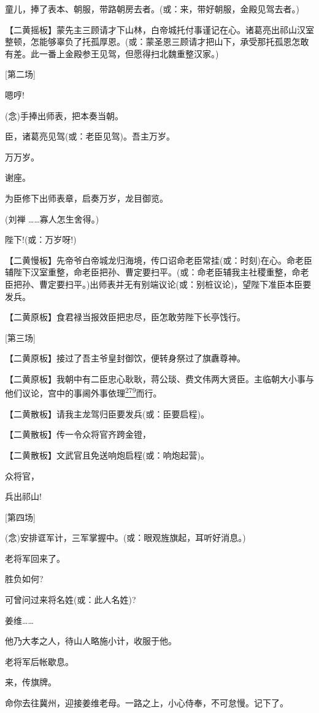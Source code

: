 童儿，捧了表本、朝服，带路朝房去者。(或：来，带好朝服，金殿见驾去者。)

【二黄摇板】蒙先主三顾请才下山林，白帝城托付事谨记在心。诸葛亮出祁山汉室整顿，怎能够辜负了托孤厚恩。(或：蒙圣恩三顾请才把山下，承受那托孤恩怎敢有差。此一番上金殿参王见驾，但愿得扫北魏重整汉家。)

{[}第二场{]}

嗯哼!

(念)手捧出师表，把本奏当朝。

臣，诸葛亮见驾(或：老臣见驾)。吾主万岁。

万万岁。

谢座。

为臣修下出师表章，启奏万岁，龙目御览。

(刘禅 \ldots{}\ldots{}寡人怎生舍得。)

陛下!(或：万岁呀!)

【二黄慢板】先帝爷白帝城龙归海境，传口诏命老臣常挂(或：时刻)在心。命老臣辅陛下汉室重整，命老臣把孙、曹定要扫平。(或：命老臣辅我主社稷重整，命老臣把孙、曹定要扫平。)出师表并无有别端议论(或：别桩议论)，望陛下准臣本臣要发兵。

【二黄原板】食君禄当报效臣把忠尽，臣怎敢劳陛下长亭饯行。

{[}第三场{]}

【二黄原板】接过了吾主爷皇封御饮，便转身祭过了旗纛尊神。

【二黄原板】我朝中有二臣忠心耿耿，蒋公琰、费文伟两大贤臣。主临朝大小事与他们议论，宫中的事阃外事依理\protect\hyperlink{fn279}{\textsuperscript{279}}而行。

【二黄散板】请我主龙驾归臣要发兵(或：臣要启程)。

【二黄散板】传一令众将官齐跨金镫，

【二黄散板】文武官且免送响炮启程(或：响炮起营)。

众将官，

兵出祁山!

{[}第四场{]}

(念)安排诓军计，三军掌握中。(或：眼观旌旗起，耳听好消息。)

老将军回来了。

胜负如何?

可曾问过来将名姓(或：此人名姓)?

姜维\ldots{}\ldots{}

他乃大孝之人，待山人略施小计，收服于他。

老将军后帐歇息。

来，传旗牌。

命你去往冀州，迎接姜维老母。一路之上，小心侍奉，不可怠慢。记下了。

